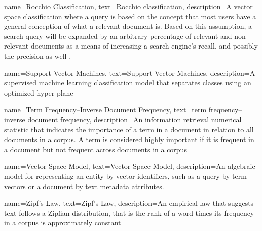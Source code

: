 {
    name=Rocchio Classification,
    text=Rocchio classification,
    description={A vector space classification where a query is based on the concept that most users have a general conception of what a relevant document is. Based on this assumption, a search query will be expanded by an arbitrary percentage of relevant and non-relevant documents as a means of increasing a search engine's recall, and possibly the precision as well \cite{Manning2008}}.
}

{
    name=Support Vector Machines,
    text=Support Vector Machines,
    description=A supervised machine learning classification model that separates classes using an optimized hyper plane
}

{
    name=Term Frequency–Inverse Document Frequency,
    text=term frequency–inverse document frequency,
    description=An information retrieval numerical statistic that indicates the importance of a term in a document in relation to all documents in a corpus. A term is considered highly important if it is frequent in a document but not frequent across documents in a corpus
}

{
    name=Vector Space Model,
    text=Vector Space Model,
    description={An algebraic model for representing an entity by vector identifiers, such as a query by term vectors or a document by text metadata attributes.}
}

{
    name=Zipf's Law,
    text=Zipf's Law,
    description={An empirical law that suggests text follows a Zipfian distribution, that is the rank of a word times its frequency in a corpus is approximately constant}
}